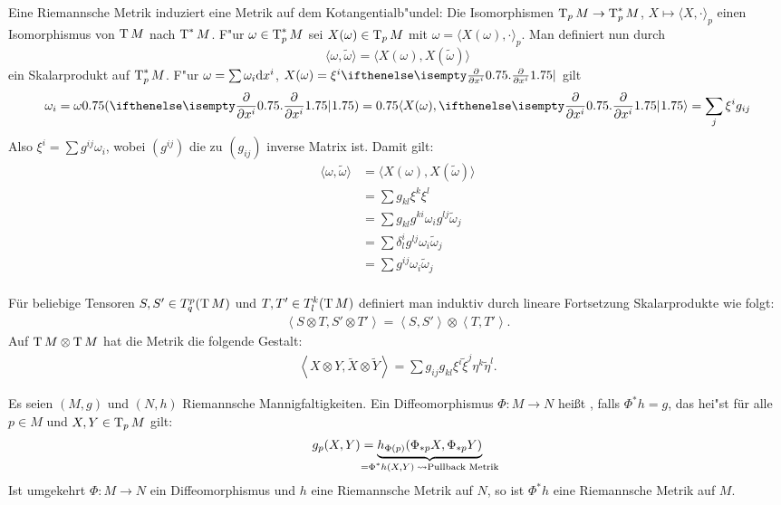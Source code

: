 Eine Riemannsche Metrik induziert eine Metrik auf dem Kotangentialb"undel: Die Isomorphismen $\operatorname{T}_pM \to \operatorname{T}_p^*M$, $X \mapsto \langle X, \cdot \rangle_p$ einen Isomorphismus von $\operatorname{T} M$ nach $\operatorname{T}^*M$. F"ur $\omega \in \operatorname{T}_p^*M$ sei $X(\omega) \in \operatorname{T}_pM$ mit $\omega = \langle X(\omega), \cdot \rangle_p$. Man definiert nun durch
	\[ \langle \omega, \tilde \omega \rangle = \langle X(\omega), X(\tilde \omega) \rangle \]
ein Skalarprodukt auf $\operatorname{T}_p^*M$. F"ur $\omega = \sum \omega_i \mathrm{d} x^{i}$, $X(\omega) = \xi^{i} \pdifffrac{}{x^{i}}$ gilt
	\[ \omega_i = \omega \left( \pdifffrac{}{x^{i}} \right) = \left\langle X(\omega), \pdifffrac{}{x^{i}} \right\rangle = \sum_j \xi^{i} g_{ij} \]
Also $\xi^{i} = \sum g^{ij} \omega_i$, wobei $(g^{ij})$ die zu $(g_{ij})$ inverse Matrix ist. Damit gilt:
\begin{align*}
	\langle \omega, \tilde \omega \rangle &= \langle X(\omega), X(\tilde \omega) \rangle \\
	&= \sum g_{kl} \xi^k \xi^l\\
	&= \sum g_{kl} g^{ki} \omega_i g^{lj} \tilde \omega_j\\
	&= \sum \delta_l^i g^{lj} \omega_i \tilde \omega_j\\
	&= \sum g^{ij} \omega_i \tilde \omega_j\\
\end{align*}



Für beliebige Tensoren $S, S' \in T_q^p(\operatorname{T} M)$ und $T, T' \in T_l^k(\operatorname{T} M)$ definiert man induktiv durch lineare Fortsetzung Skalarprodukte wie folgt:
\begin{align*}
  \left<S \otimes T, S' \otimes T'\right> = \left<S,S'\right> \otimes \left<T,T'\right>.
\end{align*}
Auf $\operatorname{T} M \otimes \operatorname{T} M$ hat die Metrik die folgende Gestalt:
\begin{align*}
  \left<X \otimes Y,\tilde X \otimes \tilde Y\right> = \sum g_{ij}g_{kl}\xi^i\tilde\xi^j\eta^k\tilde\eta^l.
\end{align*}

\begin{Dfn}
  Es seien $(M, g)$ und $(N,h)$ Riemannsche Mannigfaltigkeiten.
Ein Diffeomorphismus $\Phi \colon M \to N$ heißt , falls $\Phi^{*}h = g$, das hei"st für alle $p \in M$ und $X,Y \in \operatorname{T}_pM$ gilt:
\begin{align*}
  g_p(X,Y) = \underbrace{h_{\Phi(p)}(\Phi_{*p}X,\Phi_{*p}Y)}_{\mathclap{= \Phi^{*}h(X,Y) \; \rightsquigarrow \text{Pullback Metrik}}}
\end{align*}
Ist umgekehrt $\Phi \colon M \to N$ ein Diffeomorphismus und $h$ eine Riemannsche Metrik auf $N$, so ist $\Phi^{*}h$ eine Riemannsche Metrik auf $M$.
\end{Dfn}

